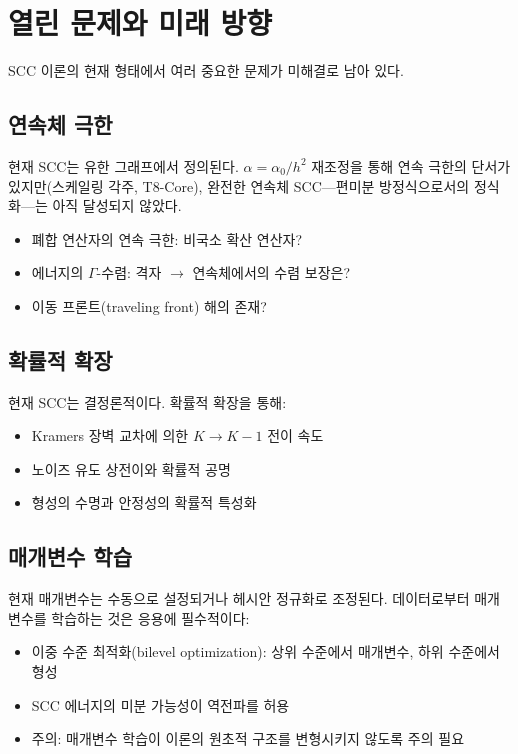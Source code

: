 \section{열린 문제와 미래 방향}
\label{sec:open-problems}

SCC 이론의 현재 형태에서 여러 중요한 문제가 미해결로 남아 있다.

\subsection{연속체 극한}

현재 SCC는 유한 그래프에서 정의된다. $\alpha = \alpha_0 / h^2$ 재조정을 통해 연속 극한의 단서가 있지만(스케일링 각주, T8-Core), 완전한 연속체 SCC---편미분 방정식으로서의 정식화---는 아직 달성되지 않았다.

\begin{itemize}
    \item 폐합 연산자의 연속 극한: 비국소 확산 연산자?
    \item 에너지의 $\Gamma$-수렴: 격자 $\to$ 연속체에서의 수렴 보장은?
    \item 이동 프론트(traveling front) 해의 존재?
\end{itemize}

\subsection{확률적 확장}

현재 SCC는 결정론적이다. 확률적 확장을 통해:
\begin{itemize}
    \item Kramers 장벽 교차에 의한 $K \to K-1$ 전이 속도
    \item 노이즈 유도 상전이와 확률적 공명
    \item 형성의 수명과 안정성의 확률적 특성화
\end{itemize}

\subsection{매개변수 학습}

현재 매개변수는 수동으로 설정되거나 헤시안 정규화로 조정된다. 데이터로부터 매개변수를 학습하는 것은 응용에 필수적이다:
\begin{itemize}
    \item 이중 수준 최적화(bilevel optimization): 상위 수준에서 매개변수, 하위 수준에서 형성
    \item SCC 에너지의 미분 가능성이 역전파를 허용
    \item 주의: 매개변수 학습이 이론의 원초적 구조를 변형시키지 않도록 주의 필요
\end{itemize}

